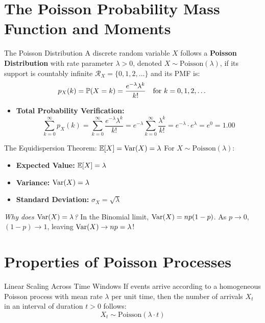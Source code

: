 \section{The Poisson Probability Mass Function and Moments}

\begin{definitionbox}{The Poisson Distribution}
A discrete random variable $X$ follows a \textbf{Poisson Distribution} with rate parameter $\lambda > 0$, denoted $X \sim \text{Poisson}(\lambda)$, if its support is countably infinite $\mathcal{R}_X = \{0, 1, 2, \dots\}$ and its PMF is:
$$p_X(k) = \P(X = k) = \frac{e^{-\lambda} \lambda^k}{k!} \quad \text{for } k = 0, 1, 2, \dots$$
\begin{itemize}
    \item \textbf{Total Probability Verification:}
    $$\sum_{k=0}^\infty p_X(k) = \sum_{k=0}^\infty \frac{e^{-\lambda}\lambda^k}{k!} = e^{-\lambda} \sum_{k=0}^\infty \frac{\lambda^k}{k!} = e^{-\lambda} \cdot e^\lambda = e^0 = \mathbf{1.00}$$
\end{itemize}
\end{definitionbox}

\begin{theorembox}{The Equidispersion Theorem: $\E[X] = \Var(X) = \lambda$}
For $X \sim \text{Poisson}(\lambda)$:
\begin{itemize}
    \item \textbf{Expected Value:} $\E[X] = \mathbf{\lambda}$
    \item \textbf{Variance:} $\Var(X) = \mathbf{\lambda}$
    \item \textbf{Standard Deviation:} $\sigma_X = \sqrt{\lambda}$
\end{itemize}
\textit{Why does $\Var(X) = \lambda$?} In the Binomial limit, $\Var(X) = np(1-p)$. As $p \to 0$, $(1 - p) \to 1$, leaving $\Var(X) \to np = \lambda$!
\end{theorembox}

\section{Properties of Poisson Processes}

\begin{theorembox}{Linear Scaling Across Time Windows}
If events arrive according to a homogeneous Poisson process with mean rate $\lambda$ per unit time, then the number of arrivals $X_t$ in an interval of duration $t > 0$ follows:
$$X_t \sim \text{Poisson}(\lambda \cdot t)$$
\end{theorembox}


